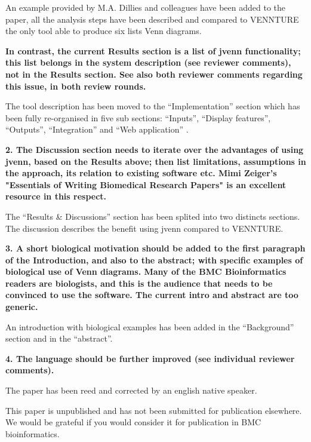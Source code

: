\documentclass[10pt,stdletter,dateno,sigleft]{newlfm} %
\begin{document}
\begin{newlfm}
An example provided by M.A. Dillies and colleagues have been added to the paper,
all the analysis steps have been described and compared to VENNTURE the only
tool able to produce six lists Venn diagrams.

\textbf{In contrast, the current Results section is a list of jvenn
functionality; this list belongs in the system description (see reviewer
comments), not in the Results section. See also both reviewer comments regarding
this issue, in both review rounds.}

The tool description has been moved to the ``Implementation'' section which has
been fully re-organised in five sub sections: ``Inputs'', ``Display features'',
``Outputs'', ``Integration'' and ``Web application'' .


\textbf{2. The Discussion section needs to iterate over the advantages of using
jvenn, based on the Results above; then list limitations, assumptions in the
approach, its relation to existing software etc. Mimi Zeiger's "Essentials of
Writing Biomedical Research Papers" is an excellent resource in this respect.}

The ``Results & Discussions'' section has been splited into two distincts
sections. The discussion describes the benefit using jvenn compared to VENNTURE.


\textbf{3. A short biological motivation should be added to the first paragraph
of the Introduction, and also to the abstract; with specific examples of
biological use of Venn diagrams. Many of the BMC Bioinformatics readers are
biologists, and this is the audience that needs to be convinced to use the
software. The current intro and abstract are too generic.}

An introduction with biological examples has been added in the ``Background''
section and in the ``abstract''.


\textbf{4. The language should be further improved (see individual reviewer
comments).}

The paper has been reed and corrected by an english native speaker.



This paper is unpublished and has not been submitted for publication elsewhere. 
We would be grateful if you would consider it for publication in BMC 
bioinformatics.


\end{newlfm}
\end{document}
